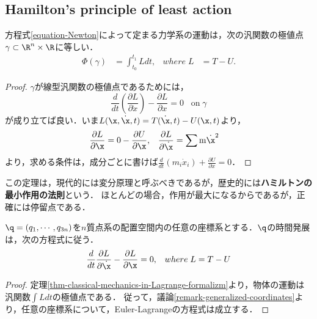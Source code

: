 \documentclass[uplatex, 12pt, dvipdfmx]{jsreport}
\begin{document}
\subsection{Hamilton's principle of least action}

\begin{theorem}\label{thm-classical-mechanics-in-Lagrange-formalizm}
    方程式\ref{equation-Newton}によって定まる力学系の運動は，次の汎関数の極値点$\gamma\subset\R^n\times\R$に等しい．
    \begin{align*}
        \Phi(\gamma)&=\int^{t_1}_{t_0}Ldt,&where\;L&=T-U.
    \end{align*}
\end{theorem}
\begin{proof}
    $\gamma$が線型汎関数の極値点であるためには，
    \[ \frac{d}{dt}\left(\frac{\partial L}{\partial\dot{x}}\right) - \frac{\partial L}{\partial x} = 0\;\;\;\mathrm{on\;}\gamma \]
    が成り立てば良い．いま$L(\x,\dot{\x},t)=T(\dot{\x},t)-U(\x,t)$より，
    \begin{align*}
        \frac{\partial L}{\partial\x}&=0-\frac{\partial U}{\partial\x},&\frac{\partial L}{\partial\dot{\x}}&=\sum \mathrm{m}\dot{\x}^2
    \end{align*}
    より，求める条件は，成分ごとに書けば$\frac{d}{dt}(m_i\dot{x}_i)+\frac{\partial U}{\partial x}=0$．
\end{proof}
\begin{remark}
    この定理は，現代的には変分原理と呼ぶべきであるが，歴史的には\textbf{ハミルトンの最小作用の法則}という．
    ほとんどの場合，作用が最大になるからであるが，正確には停留点である．
\end{remark}

\begin{corollary}
    $\q=(q_1,\cdots,q_{3n})$を$n$質点系の配置空間内の任意の座標系とする．$\q$の時間発展は，次の方程式に従う．
    \begin{align*}
        \frac{d}{dt}\frac{\partial L}{\partial\dot{\x}}-\frac{\partial L}{\partial\x}&=0,&where\;L=T-U
    \end{align*}
\end{corollary}
\begin{proof}
    定理\ref{thm-classical-mechanics-in-Lagrange-formalizm}より，物体の運動は汎関数$\int Ldt$の極値点である．
    従って，議論\ref{remark-generalized-coordinates}より，任意の座標系について，Euler-Lagrangeの方程式は成立する．
\end{proof}
\end{document}
